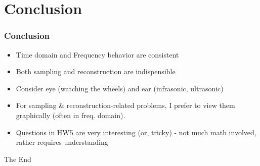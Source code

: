 \documentclass{beamer}
\begin{document}
\section{Conclusion}
\begin{frame}
\frametitle{Conclusion}
\begin{itemize}
\item Time domain and Frequency behavior are consistent
\item Both sampling and reconstruction are indispensible
\item Consider eye (watching the wheels) and ear (infrasonic, ultrasonic)
\item For sampling \& reconstruction-related problems, I prefer to view them graphically (often in freq. domain).
\item Questions in HW5 are very interesting (or, tricky) - not much math involved, rather requires understanding
\end{itemize}
\end{frame}


\begin{frame}
\Huge{\centerline{The End}}
\end{frame}

\end{document}
